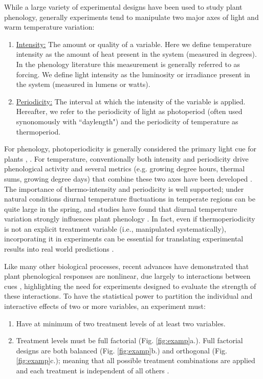 \documentclass[11pt]{article}
\begin{document}
While a large variety of experimental designs have been used to study plant phenology, generally experiments tend to manipulate two major axes of light and warm temperature variation:
\begin{enumerate}
\item \underline{Intensity:} The amount or quality of a variable. Here we define temperature intensity as the amount of heat present in the system (measured in degrees). In the phenology literature this measurement is generally referred to as forcing. We define light intensity as the luminosity or irradiance present in the system (measured in lumens or watts). 
\item \underline{Periodicity:} The interval at which the intensity of the variable is applied. Hereafter, we refer to the periodicity of light as photoperiod (often used synonomously with ``daylength") and the periodicity of temperature as thermoperiod. 
\end{enumerate}
For phenology, photoperiodicity is generally considered the primary light cue for plants \citep{WAY:2015aa}, \citep[though regarding light intensity and phenology see][]{Brelsford2018,Cober1996}. For temperature, conventionally both intensity and periodicity drive phenological activity and several metrics (e.g. growing degree hours, thermal sums, growing degree days)  that combine these two axes have been developed \citep{Gu:2016wa}. The importance of thermo-intensity and periodicity is well supported; under natural conditions diurnal temperature fluctuations in temperate regions can be quite large in the spring, and studies have found that diurnal temperature variation strongly influences plant phenology \citep{Burghardt:2016uy}. In fact, even if thermoperiodicity is not an explicit treatment variable (i.e., manipulated systematically), incorporating it in experiments can be essential for translating experimental results into real world predictions \citep{plants9101312}.

Like many other biological processes, recent advances have demonstrated that plant phenological responses are nonlinear, due largely to interactions between cues \citep{limitingcues,fu2015}, highlighting the need for experiments designed to evaluate the strength of these interactions. To have the statistical power to partition the individual and interactive effects of two or more variables, an experiment must:
\begin{enumerate}
\item Have at minimum of two treatment levels of at least two variables.
\item Treatment levels must be full factorial (Fig. \ref{fig:examp}a.). Full factorial designs are both balanced (Fig. \ref{fig:examp}b.)  and orthogonal (Fig. \ref{fig:examp}c.); meaning that all possible treatment combinations are applied and each treatment is independent of all others \citep{cheng2016}.
\end{enumerate}
\end{document}
